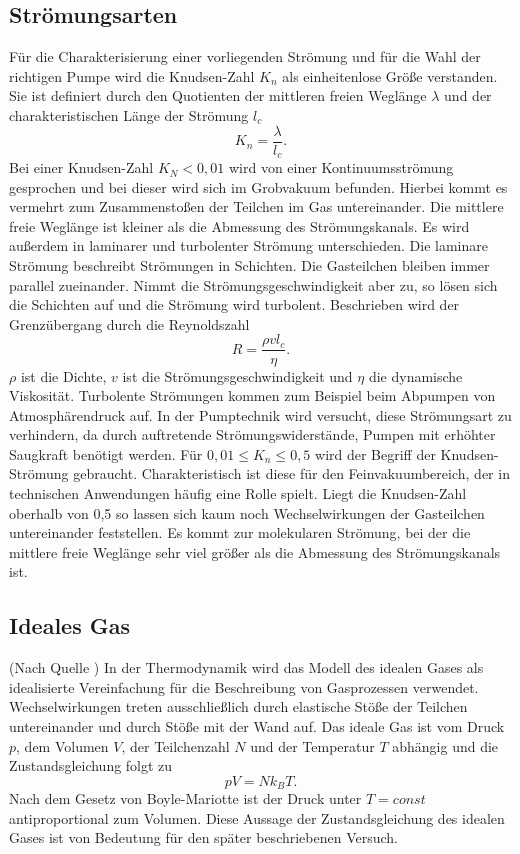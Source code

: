\subsection{Strömungsarten}
Für die Charakterisierung einer vorliegenden Strömung und für die Wahl der richtigen Pumpe wird die Knudsen-Zahl $K_n$ als einheitenlose Größe verstanden.
Sie ist definiert durch den Quotienten der mittleren freien Weglänge $\lambda$ und der charakteristischen Länge der Strömung $l_c$
\begin{equation}
  K_n=\frac{\lambda}{l_c}.
\end{equation}
Bei einer Knudsen-Zahl $K_N < 0,01$ wird von einer Kontinuumsströmung gesprochen und bei dieser wird sich im Grobvakuum befunden. Hierbei kommt es vermehrt zum Zusammenstoßen der Teilchen im Gas
untereinander. Die mittlere freie Weglänge ist kleiner als die Abmessung des Strömungskanals.
Es wird außerdem in laminarer und turbolenter Strömung unterschieden.
Die laminare Strömung beschreibt Strömungen in Schichten. Die Gasteilchen bleiben immer parallel zueinander.
Nimmt die Strömungsgeschwindigkeit aber zu, so lösen sich die Schichten auf und die Strömung wird turbolent.
Beschrieben wird der Grenzübergang durch die Reynoldszahl
\begin{equation}
  R=\frac{\rho v l_c}{\eta}.
\end{equation}
$\rho$ ist die Dichte, $v$ ist die Strömungsgeschwindigkeit und $\eta$ die dynamische Viskosität.
Turbolente Strömungen kommen zum Beispiel beim Abpumpen von Atmosphärendruck auf.
In der Pumptechnik wird versucht, diese Strömungsart zu verhindern, da durch auftretende Strömungswiderstände, Pumpen mit erhöhter Saugkraft benötigt werden.\newline
Für $ 0,01 \leq K_n \leq 0,5$ wird der Begriff der Knudsen-Strömung gebraucht.
Charakteristisch ist diese für den Feinvakuumbereich, der in technischen Anwendungen häufig eine Rolle spielt.\newline
Liegt die Knudsen-Zahl oberhalb von 0,5 so lassen sich kaum noch Wechselwirkungen der Gasteilchen untereinander feststellen.
Es kommt zur molekularen Strömung, bei der die mittlere freie Weglänge sehr viel größer als die Abmessung des Strömungskanals ist.
\subsection{Ideales Gas}
(Nach Quelle \cite{vakuum2})
In der Thermodynamik wird das Modell des idealen Gases als idealisierte Vereinfachung für die Beschreibung von Gasprozessen verwendet.
Wechselwirkungen treten ausschließlich durch elastische Stöße der Teilchen untereinander und durch Stöße mit der Wand auf.
Das ideale Gas ist vom Druck $p$, dem Volumen $V$, der Teilchenzahl $N$ und der Temperatur $T$ abhängig und die Zustandsgleichung
folgt zu
\begin{equation}
pV=N k_B T.
\label{eq:idealesgas}
\end{equation}
Nach dem Gesetz von Boyle-Mariotte ist der Druck unter $T=const$ antiproportional zum Volumen.
Diese Aussage der Zustandsgleichung des idealen Gases ist von Bedeutung für den später beschriebenen Versuch.
\newpage

